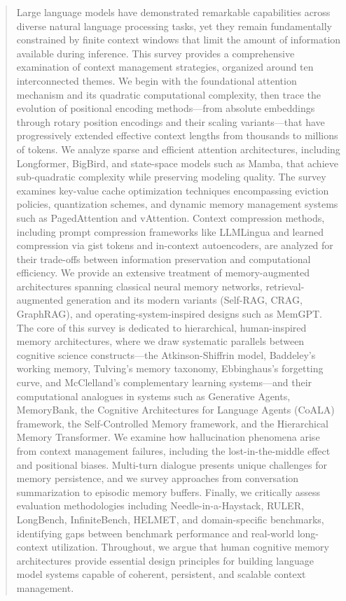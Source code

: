 \documentclass[11pt,letterpaper]{article}
\begin{document}
\begin{abstract}
\noindent
Large language models have demonstrated remarkable capabilities across diverse natural language processing tasks, yet they remain fundamentally constrained by finite context windows that limit the amount of information available during inference. This survey provides a comprehensive examination of context management strategies, organized around ten interconnected themes. We begin with the foundational attention mechanism and its quadratic computational complexity, then trace the evolution of positional encoding methods---from absolute embeddings through rotary position encodings and their scaling variants---that have progressively extended effective context lengths from thousands to millions of tokens. We analyze sparse and efficient attention architectures, including Longformer, BigBird, and state-space models such as Mamba, that achieve sub-quadratic complexity while preserving modeling quality. The survey examines key-value cache optimization techniques encompassing eviction policies, quantization schemes, and dynamic memory management systems such as PagedAttention and vAttention. Context compression methods, including prompt compression frameworks like LLMLingua and learned compression via gist tokens and in-context autoencoders, are analyzed for their trade-offs between information preservation and computational efficiency. We provide an extensive treatment of memory-augmented architectures spanning classical neural memory networks, retrieval-augmented generation and its modern variants (Self-RAG, CRAG, GraphRAG), and operating-system-inspired designs such as MemGPT. The core of this survey is dedicated to hierarchical, human-inspired memory architectures, where we draw systematic parallels between cognitive science constructs---the Atkinson-Shiffrin model, Baddeley's working memory, Tulving's memory taxonomy, Ebbinghaus's forgetting curve, and McClelland's complementary learning systems---and their computational analogues in systems such as Generative Agents, MemoryBank, the Cognitive Architectures for Language Agents (CoALA) framework, the Self-Controlled Memory framework, and the Hierarchical Memory Transformer. We examine how hallucination phenomena arise from context management failures, including the lost-in-the-middle effect and positional biases. Multi-turn dialogue presents unique challenges for memory persistence, and we survey approaches from conversation summarization to episodic memory buffers. Finally, we critically assess evaluation methodologies including Needle-in-a-Haystack, RULER, LongBench, InfiniteBench, HELMET, and domain-specific benchmarks, identifying gaps between benchmark performance and real-world long-context utilization. Throughout, we argue that human cognitive memory architectures provide essential design principles for building language model systems capable of coherent, persistent, and scalable context management.
\end{abstract}
\end{document}
